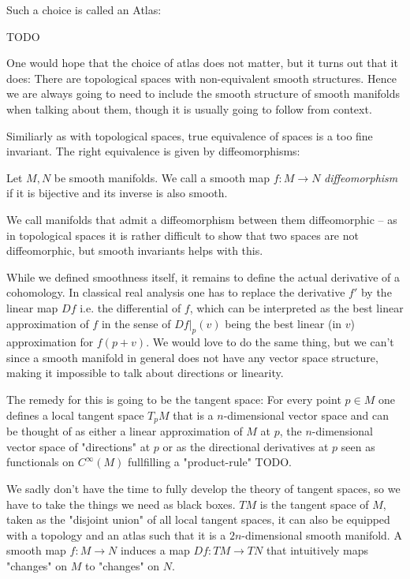 Such a choice is called an Atlas:
\begin{definition}
TODO
\end{definition}
One would hope that the choice of atlas does not matter, but it turns out that it does: There are topological spaces
with non-equivalent smooth structures. Hence we are always going to need to include the smooth structure of smooth
manifolds when talking about them, though it is usually going to follow from context.

Similiarly as with topological spaces, true equivalence of spaces is a too fine invariant. The right equivalence is
given by diffeomorphisms:
\begin{definition}
	Let $M,N$ be smooth manifolds. We call a smooth map $f: M \to N$ \textit{diffeomorphism} if it is bijective and
	its inverse is also smooth.
\end{definition}
We call manifolds that admit a diffeomorphism between them diffeomorphic – as in topological spaces it is rather difficult
to show that two spaces are not diffeomorphic, but smooth invariants helps with this.

While we defined smoothness itself, it remains to define the actual derivative of a cohomology.
In classical real analysis one has to replace the derivative $f'$ by the linear
map $Df$ i.e. the differential of $f$, which can be interpreted as the best linear
approximation of $f$ in the sense of $Df|_p(v)$ being the best linear (in $v$)
approximation for $f(p + v)$. We would love to do the same thing, but we can't since a
smooth manifold in general does not have any vector space structure, making it impossible
to talk about directions or linearity.

The remedy for this is going to be the tangent space: For every point $p \in M$ one
defines a local tangent space $T_p M$ that is a $n$-dimensional vector space and can
be thought of as either a linear approximation of $M$ at $p$, the $n$-dimensional vector
space of "directions" at $p$ or as the directional derivatives at $p$ seen as functionals
on $C^\infty(M)$ fullfilling a "product-rule" TODO.

We sadly don't have the time to fully develop the theory of tangent spaces, so we have
to take the things we need as black boxes. $TM$ is the tangent space of $M$, taken as the
"disjoint union" of all local tangent spaces, it can also be equipped with a topology and
an atlas such that it is a $2n$-dimensional smooth manifold. A smooth map $f: M \to N$
induces a map $Df: TM \to TN$ that intuitively maps "changes" on $M$ to "changes" on $N$.

